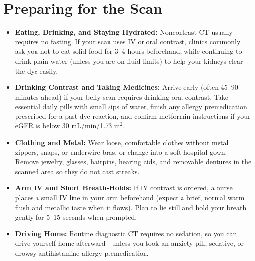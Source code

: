 \section{Preparing for the Scan}
\begin{itemize}
    \item \textbf{Eating, Drinking, and Staying Hydrated:} Noncontrast CT usually requires no fasting. If your scan uses IV or oral contrast, clinics commonly ask you not to eat solid food for 3--4 hours beforehand, while continuing to drink plain water (unless you are on fluid limits) to help your kidneys clear the dye easily.
    \item \textbf{Drinking Contrast and Taking Medicines:} Arrive early (often 45--90 minutes ahead) if your belly scan requires drinking oral contrast. Take essential daily pills with small sips of water, finish any allergy premedication prescribed for a past dye reaction, and confirm metformin instructions if your eGFR is below 30 mL/min/1.73 m$^2$.
    \item \textbf{Clothing and Metal:} Wear loose, comfortable clothes without metal zippers, snaps, or underwire bras, or change into a soft hospital gown. Remove jewelry, glasses, hairpins, hearing aids, and removable dentures in the scanned area so they do not cast streaks.
    \item \textbf{Arm IV and Short Breath-Holds:} If IV contrast is ordered, a nurse places a small IV line in your arm beforehand (expect a brief, normal warm flush and metallic taste when it flows). Plan to lie still and hold your breath gently for 5--15 seconds when prompted.
    \item \textbf{Driving Home:} Routine diagnostic CT requires no sedation, so you can drive yourself home afterward---unless you took an anxiety pill, sedative, or drowsy antihistamine allergy premedication.
\end{itemize}

